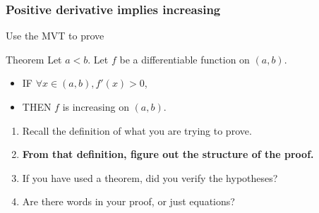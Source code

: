 \documentclass[14pt]{beamer}
\begin{document}
	\begin{frame}[t]
		\frametitle{Positive derivative implies increasing}

		Use the MVT to prove

		\begin{block}{Theorem}
			Let $a < b$. Let $f$ be a differentiable function on $(a,b)$.
			\begin{itemize}
				\item IF $\forall x \in (a,b), f'(x) >0$,

				\item THEN $f$ is increasing on $(a,b)$.
			\end{itemize}
		\end{block}


		\begin{enumerate}
			\item Recall the definition of what you are trying to prove.

			\item {\bfseries From that definition, figure out the structure of the proof.}

			\item If you have used a theorem, did you verify the hypotheses?

			\item Are there words in your proof, or just equations?
		\end{enumerate}
	\end{frame}

\end{document}
